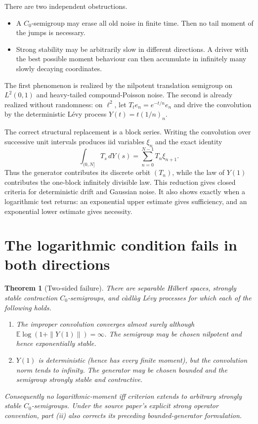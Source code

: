 \documentclass[11pt]{article}
\newtheorem{theorem}{Theorem}
\theoremstyle{remark}
\newcommand{\E}{\mathbb E}
\begin{document}
There are two independent obstructions.

\begin{itemize}[leftmargin=2em]
\item A $C_0$-semigroup may erase all old noise in finite time.  Then no tail
moment of the jumps is necessary.
\item Strong stability may be arbitrarily slow in different directions.  A
driver with the best possible moment behaviour can then accumulate in
infinitely many slowly decaying coordinates.
\end{itemize}

The first phenomenon is realized by the nilpotent translation semigroup on
$L^2(0,1)$ and heavy-tailed compound-Poisson noise.  The second is already
realized without randomness: on $\ell^2$, let
$T_te_n=e^{-t/n}e_n$ and drive the convolution by the deterministic L\'evy
process $Y(t)=t(1/n)_n$.

The correct structural replacement is a block series.  Writing the
convolution over successive unit intervals produces iid variables $\xi_n$
and the exact identity
\[
 \int_{(0,N]}T_s\,dY(s)=\sum_{n=0}^{N-1}T_n\xi_{n+1}.
\]
Thus the generator contributes its discrete orbit $(T_n)$, while the law of
$Y(1)$ contributes the one-block infinitely divisible law.  This reduction
gives closed criteria for deterministic drift and Gaussian noise.  It also
shows exactly when a logarithmic test returns: an exponential upper estimate
gives sufficiency, and an exponential lower estimate gives necessity.

\section{The logarithmic condition fails in both directions}

\begin{theorem}[Two-sided failure]\label{thm:two-sided}
There are separable Hilbert spaces, strongly stable contraction
$C_0$-semigroups, and c\`adl\`ag L\'evy processes for which each of the
following holds.
\begin{enumerate}[label=\textup{(\roman*)}]
\item The improper convolution converges almost surely although
$\E\log(1+\|Y(1)\|)=\infty$.  The semigroup may be chosen nilpotent and hence
exponentially stable.
\item $Y(1)$ is deterministic (hence has every finite moment), but the
convolution norm tends to infinity.  The generator may be chosen bounded and
the semigroup strongly stable and contractive.
\end{enumerate}
Consequently no logarithmic-moment iff criterion extends to arbitrary
strongly stable $C_0$-semigroups.  Under the source paper's explicit strong
operator convention, part \textup{(ii)} also corrects its preceding
bounded-generator formulation.
\end{theorem}
\end{document}
